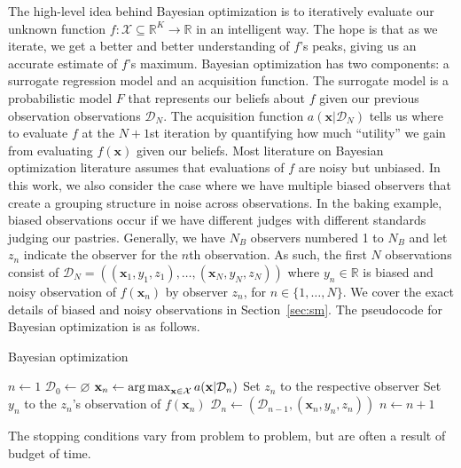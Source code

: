 The high-level idea behind Bayesian optimization is to iteratively evaluate our unknown
function $f: \mathcal{X} \subseteq \mathbb{R}^{K} \to \mathbb{R}$ in an intelligent way.
The hope is that as we iterate, we get a better and better understanding of $f$'s
peaks, giving us an accurate estimate of $f$'s maximum.
Bayesian optimization has two components: a surrogate regression model and an acquisition function.
The surrogate model is a probabilistic model $F$ that represents our beliefs about $f$ given our previous observation observations $\mathcal{D}_N$.
The acquisition function $a( \mathbf{x} | \mathcal{D}_N)$ tells us where to evaluate $f$ at the $N + 1$st iteration by
quantifying how much ``utility'' we gain from evaluating $f(\mathbf{x})$ given our beliefs.
Most literature on Bayesian optimization literature assumes that evaluations of $f$ are noisy but unbiased.
In this work, we also consider the case where we have multiple biased observers that create a grouping structure in noise across observations.
In the baking example, biased observations occur if we have different judges with different standards judging our pastries.
Generally, we have $N_B$ observers numbered 1 to $N_B$ and let $z_n$ indicate the observer for the $n$th observation.
As such, the first $N$ observations consist of $\mathcal{D}_N = ((\mathbf{x}_1, y_1, z_1), \dots, (\mathbf{x}_N, y_N, z_N))$ where
$y_n \in \mathbb{R}$ is biased and noisy observation of $f(\mathbf{x}_n)$ by observer $z_n$, for $n \in \{ 1, \dots, N \}$.
We cover the exact details of biased and noisy observations in Section~\ref{sec:sm}.
The pseudocode for Bayesian optimization is as follows.
\begin{algorithm}
    \begin{algorithmic}[1]
        \caption{Bayesian optimization}
        \label{alg:bo}
        \State $n \gets 1$
        \State $\mathcal{D}_0 \gets \varnothing$
        \State $\mathbf{x}_n \gets \operatorname*{arg\,max}_{\mathbf{x} \in \mathcal{X}} a(\mathbf{x} | \mathcal{D}_n)$  
        \State Set $z_n$ to the respective observer
        \State Set $y_n$ to the $z_n$'s observation of $f(\mathbf{x}_n)$
        \State $\mathcal{D}_n \gets (\mathcal{D}_{n - 1}, (\mathbf{x}_n, y_n, z_n))$
        \State $n \gets n + 1$
        \EndWhile
    \end{algorithmic}
\end{algorithm}
The stopping conditions vary from problem to problem, but are often a result of budget of time.

